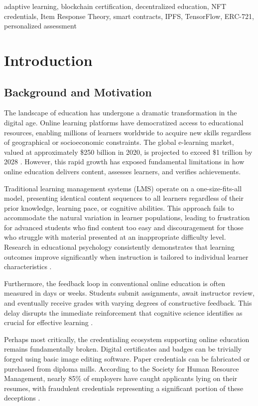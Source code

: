 \documentclass[conference]{IEEEtran}
\begin{document}
\begin{IEEEkeywords}
adaptive learning, blockchain certification, decentralized education, NFT credentials, Item Response Theory, smart contracts, IPFS, TensorFlow, ERC-721, personalized assessment
\end{IEEEkeywords}

\section{Introduction}

\subsection{Background and Motivation}

The landscape of education has undergone a dramatic transformation in the digital age. Online learning platforms have democratized access to educational resources, enabling millions of learners worldwide to acquire new skills regardless of geographical or socioeconomic constraints. The global e-learning market, valued at approximately \$250 billion in 2020, is projected to exceed \$1 trillion by 2028 \cite{b1}. However, this rapid growth has exposed fundamental limitations in how online education delivers content, assesses learners, and verifies achievements.

Traditional learning management systems (LMS) operate on a one-size-fits-all model, presenting identical content sequences to all learners regardless of their prior knowledge, learning pace, or cognitive abilities. This approach fails to accommodate the natural variation in learner populations, leading to frustration for advanced students who find content too easy and discouragement for those who struggle with material presented at an inappropriate difficulty level. Research in educational psychology consistently demonstrates that learning outcomes improve significantly when instruction is tailored to individual learner characteristics \cite{b2}.

Furthermore, the feedback loop in conventional online education is often measured in days or weeks. Students submit assignments, await instructor review, and eventually receive grades with varying degrees of constructive feedback. This delay disrupts the immediate reinforcement that cognitive science identifies as crucial for effective learning \cite{b3}.

Perhaps most critically, the credentialing ecosystem supporting online education remains fundamentally broken. Digital certificates and badges can be trivially forged using basic image editing software. Paper credentials can be fabricated or purchased from diploma mills. According to the Society for Human Resource Management, nearly 85\% of employers have caught applicants lying on their resumes, with fraudulent credentials representing a significant portion of these deceptions \cite{b4}.
\end{document}
